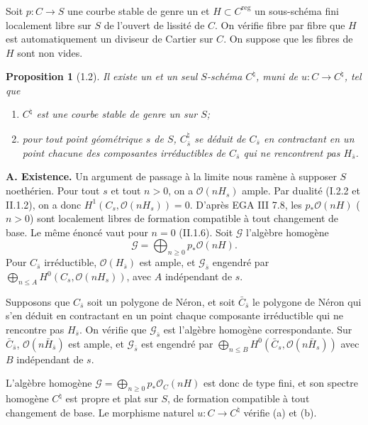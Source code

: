 \documentclass[11pt,a4paper]{amsart}
\theoremstyle{plain}
\newtheorem{proposition}[theorem]{Proposition}
\theoremstyle{definition}
\DeclareMathOperator{\reg}{reg}
\newcommand{\CO}{\mathcal{O}}
\newcommand{\CG}{\mathcal{G}}
\begin{document}
\subsubsection{}
Soit $p \colon C \to S$ une courbe stable de genre un et $H \subset C^{\reg}$ un sous-sch\'ema fini localement libre sur $S$ de l'ouvert de lissit\'e de $C$. On v\'erifie fibre par fibre que $H$ est automatiquement un diviseur de Cartier sur $C$. On suppose que les fibres de $H$ sont non vides.

\begin{proposition}[1.2]
Il existe un et un seul $S$-sch\'ema $C^{\natural}$, muni de $u \colon C \to C^{\natural}$, tel que
\begin{enumerate}[label=(\alph*)]
\item $C^{\natural}$ est une courbe stable de genre un sur $S$;
\item pour tout point g\'eom\'etrique $s$ de $S$, $C^{\natural}_{\bar{s}}$ se d\'eduit de $C_{\bar{s}}$ en contractant en un point chacune des composantes irr\'eductibles de $C_{\bar{s}}$ qui ne rencontrent pas $H_{\bar{s}}$.
\end{enumerate}
\end{proposition}

\noindent\textbf{A. Existence.} Un argument de passage \`a la limite nous ram\`ene \`a supposer $S$ noeth\'erien. Pour tout $s$ et tout $n > 0$, on a $\CO(nH_s)$ ample. Par dualit\'e (I.2.2 et II.1.2), on a donc $H^1(C_s, \CO(nH_s)) = 0$. D'apr\`es EGA III 7.8, les $p_* \CO(nH)$ ($n > 0$) sont localement libres de formation compatible \`a tout changement de base. Le m\^eme \'enonc\'e vaut pour $n=0$ (II.1.6). Soit $\CG$ l'alg\`ebre homog\`ene
\[
\CG = \bigoplus_{n \geq 0} p_* \CO(nH).
\]
Pour $C_{\bar{s}}$ irr\'eductible, $\CO(H_{\bar{s}})$ est ample, et $\CG_{\bar{s}}$ engendr\'e par $\bigoplus_{n \leq A} H^0(C_s, \CO(nH_s))$, avec $A$ ind\'ependant de $s$.

Supposons que $C_{\bar{s}}$ soit un polygone de N\'eron, et soit $\bar{C}_{\bar{s}}$ le polygone de N\'eron qui s'en d\'eduit en contractant en un point chaque composante irr\'eductible qui ne rencontre pas $H_{\bar{s}}$. On v\'erifie que $\CG_{\bar{s}}$ est l'alg\`ebre homog\`ene correspondante. Sur $\bar{C}_{\bar{s}}$, $\CO(n\bar{H}_{\bar{s}})$ est ample, et $\CG_{\bar{s}}$ est engendr\'e par $\bigoplus_{n \leq B} H^0(\bar{C}_s, \CO(n\bar{H}_s))$ avec $B$ ind\'ependant de $s$.

L'alg\`ebre homog\`ene $\CG = \bigoplus_{n \geq 0} p_* \CO_{C}(nH)$ est donc de type fini, et son spectre homog\`ene $C^{\natural}$ est propre et plat sur $S$, de formation compatible \`a tout changement de base. Le morphisme naturel $u \colon C \to C^{\natural}$ v\'erifie (a) et (b).
\end{document}
